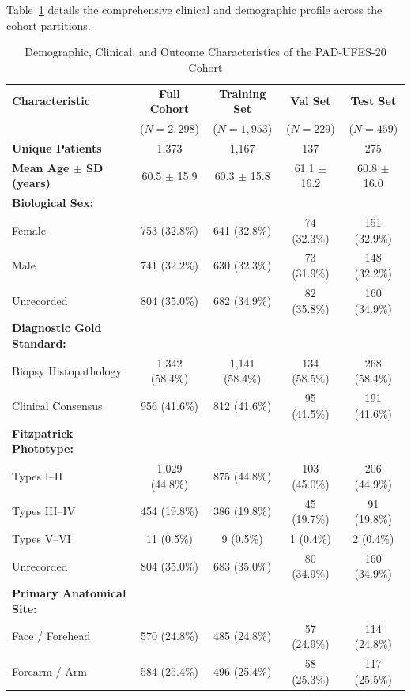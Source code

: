 \documentclass[conference]{IEEEtran}
\begin{document}
Table~\ref{tab:cohort_demographics} details the comprehensive clinical and demographic profile across the cohort partitions.

\begin{table}[h]
\caption{Demographic, Clinical, and Outcome Characteristics of the PAD-UFES-20 Cohort}
\label{tab:cohort_demographics}
\centering
\scriptsize
\setlength{\tabcolsep}{3pt}
\begin{tabular}{@{}lcccc@{}}
\toprule
\textbf{Characteristic} & \textbf{Full Cohort} & \textbf{Training Set} & \textbf{Val Set} & \textbf{Test Set} \\
 & ($N=2,298$) & ($N=1,953$) & ($N=229$) & ($N=459$) \\
\midrule
\textbf{Unique Patients} & 1,373 & 1,167 & 137 & 275 \\
\textbf{Mean Age $\pm$ SD (years)} & 60.5 $\pm$ 15.9 & 60.3 $\pm$ 15.8 & 61.1 $\pm$ 16.2 & 60.8 $\pm$ 16.0 \\
\textbf{Biological Sex:} & & & & \\
\quad Female & 753 (32.8\%) & 641 (32.8\%) & 74 (32.3\%) & 151 (32.9\%) \\
\quad Male & 741 (32.2\%) & 630 (32.3\%) & 73 (31.9\%) & 148 (32.2\%) \\
\quad Unrecorded & 804 (35.0\%) & 682 (34.9\%) & 82 (35.8\%) & 160 (34.9\%) \\
\textbf{Diagnostic Gold Standard:} & & & & \\
\quad Biopsy Histopathology & 1,342 (58.4\%) & 1,141 (58.4\%) & 134 (58.5\%) & 268 (58.4\%) \\
\quad Clinical Consensus & 956 (41.6\%) & 812 (41.6\%) & 95 (41.5\%) & 191 (41.6\%) \\
\textbf{Fitzpatrick Phototype:} & & & & \\
\quad Types I--II & 1,029 (44.8\%) & 875 (44.8\%) & 103 (45.0\%) & 206 (44.9\%) \\
\quad Types III--IV & 454 (19.8\%) & 386 (19.8\%) & 45 (19.7\%) & 91 (19.8\%) \\
\quad Types V--VI & 11 (0.5\%) & 9 (0.5\%) & 1 (0.4\%) & 2 (0.4\%) \\
\quad Unrecorded & 804 (35.0\%) & 683 (35.0\%) & 80 (34.9\%) & 160 (34.9\%) \\
\textbf{Primary Anatomical Site:} & & & & \\
\quad Face / Forehead & 570 (24.8\%) & 485 (24.8\%) & 57 (24.9\%) & 114 (24.8\%) \\
\quad Forearm / Arm & 584 (25.4\%) & 496 (25.4\%) & 58 (25.3\%) & 117 (25.5\%) \\

\end{tabular}
\end{table}
\end{document}
